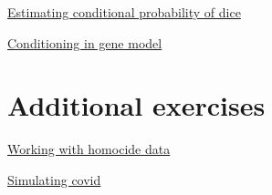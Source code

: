 \begin{exercise}
\href{https://colab.research.google.com/drive/1Gs-gSsUP1hHVwhrbwvWzLVm1ulcLJKRI#scrollTo=HT5mXESCXWYx}{Estimating conditional probability of dice}
\end{exercise}

\begin{exercise}
\href{https://colab.research.google.com/drive/1Gs-gSsUP1hHVwhrbwvWzLVm1ulcLJKRI#scrollTo=HT5mXESCXWYx}{Conditioning in gene model}
\end{exercise}

\section{Additional exercises}

\begin{exercise}
\href{https://colab.research.google.com/drive/1Gs-gSsUP1hHVwhrbwvWzLVm1ulcLJKRI#scrollTo=vogWBcGHaZDM&line=3&uniqifier=1}{Working with homocide data}
\end{exercise}

\begin{exercise}
\href{https://colab.research.google.com/drive/1Gs-gSsUP1hHVwhrbwvWzLVm1ulcLJKRI#scrollTo=TnLORrmyBn6q&line=22&uniqifier=1}{Simulating covid}
\end{exercise}









